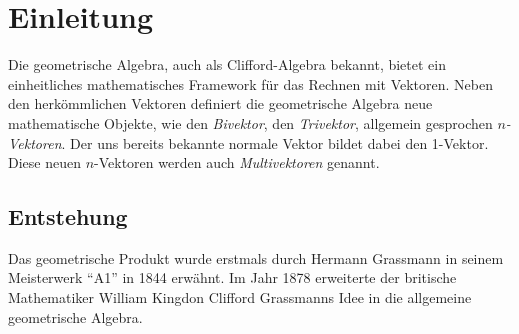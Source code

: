 %
%
%
%
\section{Einleitung\label{geoalgebra:section:einfuehrung}}
Die geometrische Algebra, auch als Clifford-Algebra bekannt, bietet ein einheitliches mathematisches
Framework für das Rechnen mit Vektoren.
Neben den herkömmlichen Vektoren definiert die geometrische
Algebra neue mathematische Objekte, wie den \emph{Bivektor}, den \emph{Trivektor}, allgemein gesprochen
\emph{$n$-Vektoren}.
Der uns bereits bekannte normale Vektor bildet dabei den 1-Vektor. Diese neuen $n$-Vektoren werden auch
\emph{Multivektoren} genannt.

\subsection{Entstehung}
Das geometrische Produkt wurde erstmals durch Hermann Grassmann in seinem Meisterwerk ``A1'' \cite{geoalgebra:grassmann1844lineale} in 1844
erwähnt. Im Jahr 1878 erweiterte der britische Mathematiker William Kingdon Clifford Grassmanns Idee
in die allgemeine geometrische Algebra. 

